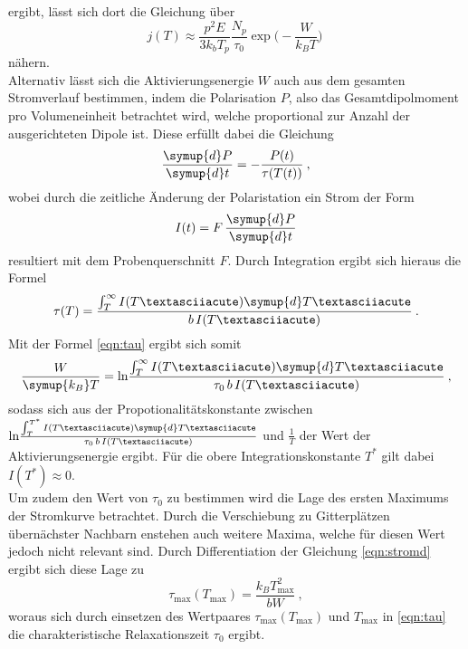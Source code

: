 ergibt, lässt sich dort die Gleichung über
\begin{equation}
  j(T)\approx \frac{p^2E}{3k_bT_p}\frac{N_p}{\tau_0} \exp{\Big(-\frac{W}{k_BT}\Big)} \:
  \label{eqn:stromnäherung}
\end{equation}
nähern. \\
Alternativ lässt sich die Aktivierungsenergie $W$ auch aus dem gesamten Stromverlauf bestimmen,
indem die Polarisation $P$, also das Gesamtdipolmoment pro Volumeneinheit betrachtet wird, welche
proportional zur Anzahl der ausgerichteten Dipole ist. Diese erfüllt dabei die Gleichung
\begin{equation}
  \frac{\symup{d}P}{\symup{d}t}=-\frac{P(t)}{\tau(T(t))} \: ,
  \label{eqn:PolDGL}
\end{equation}
wobei durch die zeitliche Änderung der Polaristation ein Strom der Form
\begin{equation}
  I(t)=F\, \frac{\symup{d}P}{\symup{d}t}
\end{equation}
resultiert mit dem Probenquerschnitt $F$. Durch Integration ergibt sich hieraus die Formel
\begin{equation}
  \tau(T)=\frac{\int_T^\infty I(T´)\symup{d}T´}{b\,I(T´)} \: .
\end{equation}
Mit der Formel \eqref{eqn:tau} ergibt sich somit
\begin{equation}
  \frac{W}{\symup{k_B}T}=\text{ln}\frac{\int_T^\infty I(T´)\symup{d}T´}{\tau_0\,b\,I(T´)} \: ,
  \label{eqn:integral}
\end{equation}
sodass sich aus der Propotionalitätskonstante zwischen $\text{ln}\frac{\int_T^{T^*} I(T´)\symup{d}T´}{\tau_0\,b\,I(T´)}$
und $\frac{1}{T}$ der Wert der Aktivierungsenergie ergibt. Für die obere Integrationskonstante $T^*$
gilt dabei $I(T^*)\approx0$. \\
Um zudem den Wert von $\tau_0$ zu bestimmen wird die Lage des ersten Maximums der Stromkurve betrachtet.
Durch die Verschiebung zu Gitterplätzen übernächster Nachbarn enstehen auch weitere Maxima,
welche für diesen Wert jedoch nicht relevant sind. Durch Differentiation der
Gleichung \eqref{eqn:stromd} ergibt sich diese Lage
zu
\begin{equation}
  \tau_{\text{max}}(T_{\text{max}})=\frac{k_BT^2_{\text{max}}}{bW} \: ,
  \label{eqn:taumax}
\end{equation}
woraus sich durch einsetzen des Wertpaares $\tau_{\text{max}}(T_{\text{max}})$ und
$T_{\text{max}}$ in \eqref{eqn:tau} die charakteristische Relaxationszeit $\tau_0$ ergibt.
